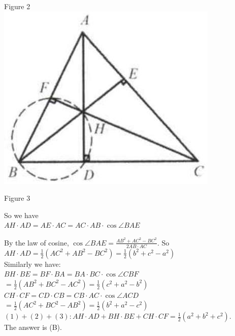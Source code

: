\documentclass{article}
\begin{document}
Figure 2\\
\centering
\includegraphics[width=\textwidth]{images/210(1).jpg}

Figure 3

So we have\\
\(A H \cdot A D=A E \cdot A C=A C \cdot A B \cdot \cos \angle B A E\)


By the law of cosine, \(\cos \angle B A E=\frac{A B^{2}+A C^{2}-B C^{2}}{2 A B \cdot A C}\). So\\
\(A H \cdot A D=\frac{1}{2}\left(A C^{2}+A B^{2}-B C^{2}\right)=\frac{1}{2}\left(b^{2}+c^{2}-a^{2}\right)\)\\
Similarly we have:\\
\(B H \cdot B E=B F \cdot B A=B A \cdot B C \cdot \cos \angle C B F\)\\
\(=\frac{1}{2}\left(A B^{2}+B C^{2}-A C^{2}\right)=\frac{1}{2}\left(c^{2}+a^{2}-b^{2}\right)\)\\
\(C H \cdot C F=C D \cdot C B=C B \cdot A C \cdot \cos \angle A C D\)\\
\(=\frac{1}{2}\left(A C^{2}+B C^{2}-A B^{2}\right)=\frac{1}{2}\left(b^{2}+a^{2}-c^{2}\right)\)\\
\((1)+(2)+(3): A H \cdot A D+B H \cdot B E+C H \cdot C F=\frac{1}{2}\left(a^{2}+b^{2}+c^{2}\right)\).\\
The answer is (B).
\end{document}
